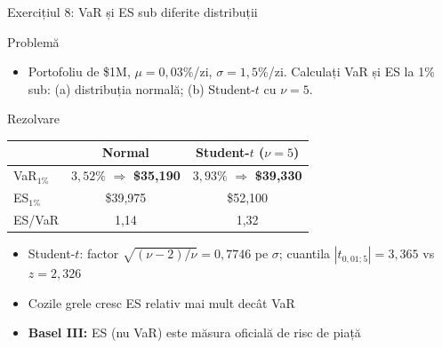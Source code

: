 \documentclass[9pt, aspectratio=169, t]{beamer}
\begin{document}
\begin{frame}{Exercițiul 8: VaR și ES sub diferite distribuții}
    \begin{cminipage}{0.95\textwidth}
\begin{block}{Problemă}
\begin{itemize}\setlength{\itemsep}{0pt}
    \item Portofoliu de \$1M, $\mu = 0{,}03\%$/zi, $\sigma = 1{,}5\%$/zi. Calculați VaR și ES la 1\% sub: (a) distribuția normală; (b) Student-$t$ cu $\nu = 5$.
\end{itemize}
\end{block}

\begin{exampleblock}{Rezolvare}
\small
\renewcommand{\arraystretch}{1.1}
\begin{center}
\begin{tabular}{lcc}
\toprule
& \textbf{Normal} & \textbf{Student-$t$ ($\nu=5$)} \\
\midrule
VaR$_{1\%}$ & $3{,}52\%$ $\Rightarrow$ \textbf{\$35{,}190} & $3{,}93\%$ $\Rightarrow$ \textbf{\$39{,}330} \\
ES$_{1\%}$ & \$39{,}975 & \$52{,}100 \\
ES/VaR & 1{,}14 & 1{,}32 \\
\bottomrule
\end{tabular}
\end{center}
\begin{itemize}\setlength{\itemsep}{0pt}
    \item Student-$t$: factor $\sqrt{(\nu-2)/\nu} = 0{,}7746$ pe $\sigma$; cuantila $|t_{0{,}01;5}| = 3{,}365$ vs $z = 2{,}326$
    \item Cozile grele cresc ES relativ mai mult decât VaR
    \item \textbf{Basel III:} ES (nu VaR) este măsura oficială de risc de piață
\end{itemize}
\end{exampleblock}
    \end{cminipage}
\end{frame}
\end{document}
